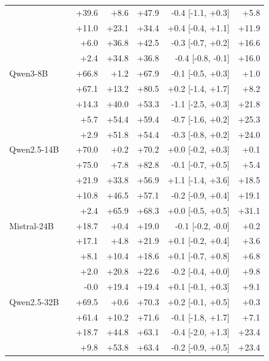 \begin{tabular}{llrrrrr}
 & \fmtOpt{} & +39.6 & +8.6 & +47.9 & -0.4 \tiny[-1.1, +0.3] & +5.8 \\
 & \fmtPost{} & +11.0 & +23.1 & +34.4 & +0.4 \tiny[-0.4, +1.1] & +11.9 \\
 & \fmtNone{} & +6.0 & +36.8 & +42.5 & -0.3 \tiny[-0.7, +0.2] & +16.6 \\
 & \fmtBefore{} & +2.4 & +34.8 & +36.8 & -0.4 \tiny[-0.8, -0.1] & +16.0 \\
\midrule
Qwen3-8B & \fmtLetter{} & +66.8 & +1.2 & +67.9 & -0.1 \tiny[-0.5, +0.3] & +1.0 \\
 & \fmtOpt{} & +67.1 & +13.2 & +80.5 & +0.2 \tiny[-1.4, +1.7] & +8.2 \\
 & \fmtPost{} & +14.3 & +40.0 & +53.3 & -1.1 \tiny[-2.5, +0.3] & +21.8 \\
 & \fmtNone{} & +5.7 & +54.4 & +59.4 & -0.7 \tiny[-1.6, +0.2] & +25.3 \\
 & \fmtBefore{} & +2.9 & +51.8 & +54.4 & -0.3 \tiny[-0.8, +0.2] & +24.0 \\
\midrule
Qwen2.5-14B & \fmtLetter{} & +70.0 & +0.2 & +70.2 & +0.0 \tiny[-0.2, +0.3] & +0.1 \\
 & \fmtOpt{} & +75.0 & +7.8 & +82.8 & -0.1 \tiny[-0.7, +0.5] & +5.4 \\
 & \fmtPost{} & +21.9 & +33.8 & +56.9 & +1.1 \tiny[-1.4, +3.6] & +18.5 \\
 & \fmtNone{} & +10.8 & +46.5 & +57.1 & -0.2 \tiny[-0.9, +0.4] & +19.1 \\
 & \fmtBefore{} & +2.4 & +65.9 & +68.3 & +0.0 \tiny[-0.5, +0.5] & +31.1 \\
\midrule
Mistral-24B & \fmtLetter{} & +18.7 & +0.4 & +19.0 & -0.1 \tiny[-0.2, -0.0] & +0.2 \\
 & \fmtOpt{} & +17.1 & +4.8 & +21.9 & +0.1 \tiny[-0.2, +0.4] & +3.6 \\
 & \fmtPost{} & +8.1 & +10.4 & +18.6 & +0.1 \tiny[-0.7, +0.8] & +6.8 \\
 & \fmtNone{} & +2.0 & +20.8 & +22.6 & -0.2 \tiny[-0.4, +0.0] & +9.8 \\
 & \fmtBefore{} & -0.0 & +19.4 & +19.4 & +0.1 \tiny[-0.1, +0.3] & +9.1 \\
\midrule
Qwen2.5-32B & \fmtLetter{} & +69.5 & +0.6 & +70.3 & +0.2 \tiny[-0.1, +0.5] & +0.3 \\
 & \fmtOpt{} & +61.4 & +10.2 & +71.6 & -0.1 \tiny[-1.8, +1.7] & +7.1 \\
 & \fmtPost{} & +18.7 & +44.8 & +63.1 & -0.4 \tiny[-2.0, +1.3] & +23.4 \\
 & \fmtNone{} & +9.8 & +53.8 & +63.4 & -0.2 \tiny[-0.9, +0.5] & +23.4 \\

\end{tabular}
